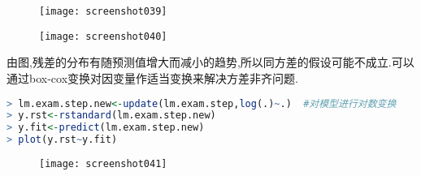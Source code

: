 \documentclass[11pt,a4paper,oneside]{book}
\begin{document}
\begin{figure}[H]
	\centering
	\texttt{[image: screenshot039]}
\end{figure}
\begin{figure}[H]
	\centering
	\texttt{[image: screenshot040]}
\end{figure}
由图,残差的分布有随预测值增大而减小的趋势,所以同方差的假设可能不成立.可以通过box-cox变换对因变量作适当变换来解决方差非齐问题.
\begin{lstlisting}[language=r]
> lm.exam.step.new<-update(lm.exam.step,log(.)~.)  #对模型进行对数变换
> y.rst<-rstandard(lm.exam.step.new)
> y.fit<-predict(lm.exam.step.new)
> plot(y.rst~y.fit)
\end{lstlisting}
\begin{figure}[H]
	\centering
	\texttt{[image: screenshot041]}
\end{figure}
\end{document}
